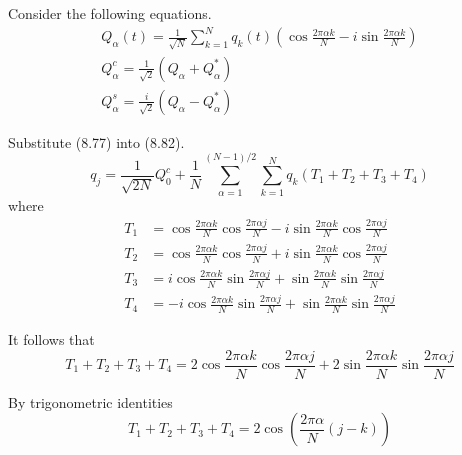 


\bigskip
Consider the following equations.
\begin{gather*}
Q_\alpha(t)=\frac{1}{\sqrt N}\sum_{k=1}^Nq_k(t)
\left(
\cos\frac{2\pi\alpha k}{N}-i\sin\frac{2\pi\alpha k}{N}
\right)
\tag{8.77}
\\
Q_\alpha^c=\frac{1}{\sqrt2}(Q_\alpha+Q_\alpha^*)
\tag{8.79}
\\
Q_\alpha^s=\frac{i}{\sqrt2}(Q_\alpha-Q_\alpha^*)
\tag{8.80}
\end{gather*}

Substitute (8.77) into (8.82).
\begin{equation*}
q_j=
\frac{1}{\sqrt{2N}}Q_0^c
+
\frac{1}{N}
\sum_{\alpha=1}^{(N-1)/2}
\sum_{k=1}^N
q_k(T_1+T_2+T_3+T_4)
\tag{1}
\end{equation*}
where
\begin{align*}
T_1&=\cos\frac{2\pi\alpha k}{N}\cos\frac{2\pi\alpha j}{N}
-i\sin\frac{2\pi\alpha k}{N}\cos\frac{2\pi\alpha j}{N}
\\
T_2&=\cos\frac{2\pi\alpha k}{N}\cos\frac{2\pi\alpha j}{N}
+i\sin\frac{2\pi\alpha k}{N}\cos\frac{2\pi\alpha j}{N}
\\
T_3&=i\cos\frac{2\pi\alpha k}{N}\sin\frac{2\pi\alpha j}{N}
+\sin\frac{2\pi\alpha k}{N}\sin\frac{2\pi\alpha j}{N}
\\
T_4&=-i\cos\frac{2\pi\alpha k}{N}\sin\frac{2\pi\alpha j}{N}
+\sin\frac{2\pi\alpha k}{N}\sin\frac{2\pi\alpha j}{N}
\end{align*}

It follows that
\begin{equation*}
T_1+T_2+T_3+T_4=
2\cos\frac{2\pi\alpha k}{N}\cos\frac{2\pi\alpha j}{N}
+2\sin\frac{2\pi\alpha k}{N}\sin\frac{2\pi\alpha j}{N}
\end{equation*}

By trigonometric identities
\begin{equation*}
T_1+T_2+T_3+T_4=2\cos\left(\frac{2\pi\alpha}{N}(j-k)\right)
\tag{2}
\end{equation*}

